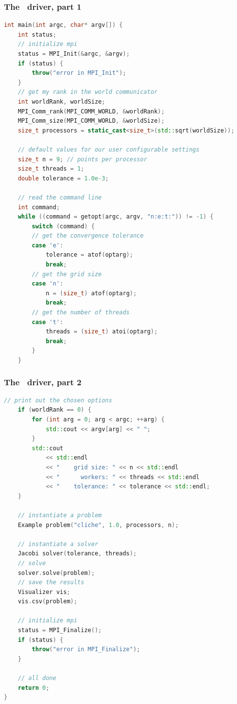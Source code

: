 \begin{frame}[fragile]
%
  \frametitle{The \mpi\ driver, part 1}
%
  \begin{lstlisting}[language=c++,name=mpi:driver,firstnumber=26,basicstyle=\tt\bfseries\tiny]
int main(int argc, char* argv[]) {
    int status;
    // initialize mpi
    status = MPI_Init(&argc, &argv);
    if (status) {
        throw("error in MPI_Init");
    }
    // get my rank in the world communicator
    int worldRank, worldSize;
    MPI_Comm_rank(MPI_COMM_WORLD, &worldRank);
    MPI_Comm_size(MPI_COMM_WORLD, &worldSize);
    size_t processors = static_cast<size_t>(std::sqrt(worldSize));

    // default values for our user configurable settings
    size_t n = 9; // points per processor
    size_t threads = 1;
    double tolerance = 1.0e-3;

    // read the command line
    int command;
    while ((command = getopt(argc, argv, "n:e:t:")) != -1) {
        switch (command) {
        // get the convergence tolerance
        case 'e':
            tolerance = atof(optarg);
            break;
        // get the grid size
        case 'n':
            n = (size_t) atof(optarg);
            break;
        // get the number of threads
        case 't':
            threads = (size_t) atoi(optarg);
            break;
        }
    }
  \end{lstlisting}
% 
\end{frame}

\begin{frame}[fragile]
%
  \frametitle{The \mpi\ driver, part 2}
%
  \begin{lstlisting}[language=c++,name=mpi:driver,basicstyle=\tt\bfseries\tiny]
    // print out the chosen options
    if (worldRank == 0) {
        for (int arg = 0; arg < argc; ++arg) {
            std::cout << argv[arg] << " ";
        }
        std::cout
            << std::endl
            << "    grid size: " << n << std::endl
            << "      workers: " << threads << std::endl
            << "    tolerance: " << tolerance << std::endl;
    }

    // instantiate a problem
    Example problem("cliche", 1.0, processors, n);

    // instantiate a solver
    Jacobi solver(tolerance, threads);
    // solve
    solver.solve(problem);
    // save the results
    Visualizer vis;
    vis.csv(problem);

    // initialize mpi
    status = MPI_Finalize();
    if (status) {
        throw("error in MPI_Finalize");
    }

    // all done
    return 0;
}
  \end{lstlisting}
% 
\end{frame}

